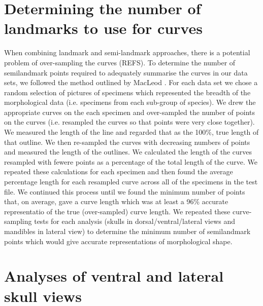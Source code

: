 \documentclass[12pt,a4paper]{article}
\begin{document}
\section{Determining the number of landmarks to use for curves}
When combining landmark and semi-landmark approaches, there is a potential problem of over-sampling the curves (REFS). To determine the number of semilandmark points required to adequately summarise the curves in our data sets,  we followed the method outlined by MacLeod \citeyearpar{MacLeod2012}. 
For each data set we chose a random selection of pictures of specimens which represented the breadth of the morphological data (i.e. specimens from each sub-group of species).  We drew the appropriate curves on the each specimen and over-sampled the number of points on the curves (i.e. resampled the curves so that points were very close together). 
We measured the length of the line and regarded that as the 100\%, true length of that outline. We then re-sampled the curves with decreasing numbers of points and measured the length of the outlines. We calculated the length of the curves resampled with fewere points as a percentage of the total length of the curve. We repeated these calculations for each specimen and then found the average percentage length for each resampled curve across all of the specimens in the test file. We continued this process until we found the minimum number of points that, on average, gave a curve length which was at least a 96\% accurate representatio of the true (over-sampled) curve length.  
We repeated these curve-sampling tests for each analysis (skulls in dorsal/ventral/lateral views and mandibles in lateral view) to determine the minimum number of semilandmark points which would give accurate representations of morphological shape.

\section{Analyses of ventral and lateral skull views}
\end{document}
